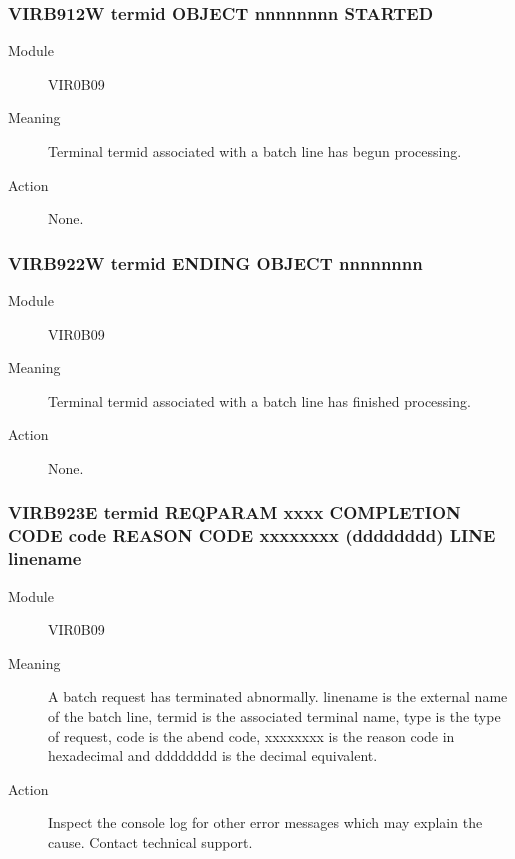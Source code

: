 \documentclass[letterpaper,10pt,english]{sphinxmanual}
\begin{document}
\subsubsection{VIRB912W termid OBJECT nnnnnnnn STARTED}
\label{\detokenize{messages:virb912w-termid-object-nnnnnnnn-started}}\begin{description}
\item[{Module}] \leavevmode
VIR0B09

\item[{Meaning}] \leavevmode
Terminal termid associated with a batch line has begun processing.

\item[{Action}] \leavevmode
None.

\end{description}


\subsubsection{VIRB922W termid ENDING OBJECT nnnnnnnn}
\label{\detokenize{messages:virb922w-termid-ending-object-nnnnnnnn}}\begin{description}
\item[{Module}] \leavevmode
VIR0B09

\item[{Meaning}] \leavevmode
Terminal termid associated with a batch line has finished processing.

\item[{Action}] \leavevmode
None.

\end{description}


\subsubsection{VIRB923E termid REQ\textbar{}PARAM xxxx COMPLETION CODE code REASON CODE xxxxxxxx (dddddddd) LINE linename}
\label{\detokenize{messages:virb923e-termid-req-param-xxxx-completion-code-code-reason-code-xxxxxxxx-dddddddd-line-linename}}\begin{description}
\item[{Module}] \leavevmode
VIR0B09

\item[{Meaning}] \leavevmode
A batch request has terminated abnormally. linename is the external name of the batch line, termid is the associated terminal name, type is the type of request, code is the abend code, xxxxxxxx is the reason code in hexadecimal and dddddddd is the decimal equivalent.

\item[{Action}] \leavevmode
Inspect the console log for other error messages which may explain the cause. Contact technical support.

\end{description}
\end{document}
